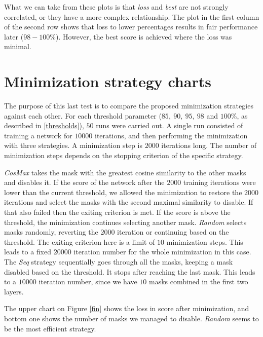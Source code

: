 \documentclass[12pt]{report}
\begin{document}
What we can take from these plots is that \textit{loss} and \textit{best} are not strongly correlated, or they have a more complex relationship. The plot in the first column of the second row shows that loss to lower percentages results in fair performance later ($98-100\%$). However, the best score is achieved where the loss was minimal.

\section{Minimization strategy charts}
The purpose of this last test is to compare the proposed minimization strategies against each other. For each threshold parameter ($ 85,\ 90,\ 95,\ 98$ and $100\%$, as described in \ref{thresholds}), $50$ runs were carried out. A single run consisted of training a network for $10000$
iterations, and then performing the minimization with three strategies. A minimization step is $2000$ iterations long. The number of minimization steps depends on the stopping criterion of the specific strategy.

\textit{CosMax} takes the mask with the greatest cosine similarity to the other masks and disables it. If the score of the network after the $2000$ training iterations were lower than the current threshold, we allowed the minimization to restore the $2000$ iterations and select the masks with the second maximal similarity to disable. If that also failed then the exiting criterion is met. If the score is above the threshold, the minimization continues selecting another mask. \textit{Random} selects masks randomly, reverting the $2000$ iteration or continuing based on the threshold. The exiting criterion here is a limit of $10$ minimization steps. This leads to a fixed $20000$ iteration number for the whole minimization in this case. The \textit{Seq} strategy sequentially goes through all the masks, keeping a mask disabled based on the threshold. It stops after reaching the last mask. This leads to a $10000$ iteration number, since we have $10$ masks combined in the first two layers.

The upper chart on Figure \ref{fin} shows the loss in score after minimization, and bottom one shows the number of masks we managed to disable. \textit{Random} seems to be the most efficient strategy.
\end{document}
